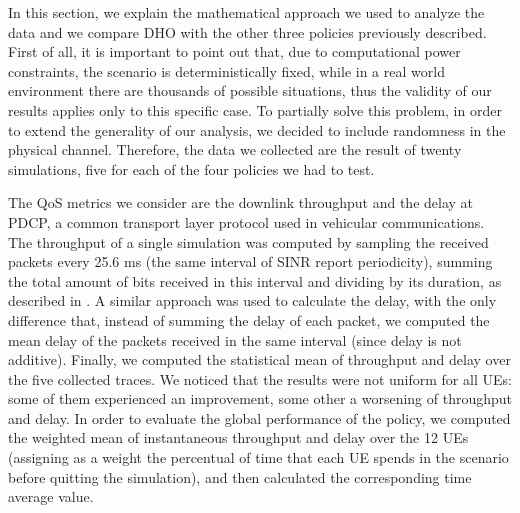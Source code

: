 \documentclass[conference,10pt]{IEEEtran}
\begin{document}
In this section, we explain the mathematical approach we used to analyze the data and we compare DHO with the other three policies previously described.
First of all, it is important to point out that, due to computational power constraints, the scenario is deterministically fixed, while in a real world environment there are thousands of possible situations, thus the validity of our results applies only to this specific case. To partially solve this problem, in order to extend the generality of our analysis, we decided to include randomness in the physical channel. Therefore, the data we collected are the result of twenty simulations, five for each of the four policies we had to test.

The QoS metrics we consider are the downlink throughput and the delay at PDCP, a common transport layer protocol used in vehicular communications. The throughput of a single simulation was computed by sampling the received packets every 25.6 ms (the same interval of SINR report periodicity), summing the total amount of bits received in this interval and dividing by its duration, as described in \cite{imphand}. A similar approach was used to calculate the delay, with the only difference that, instead of summing the delay of each packet, we computed the mean delay of the packets received in the same interval (since delay is not additive). Finally, we computed the statistical mean of throughput and delay over the five collected traces. We noticed that the results were not uniform for all UEs: some of them experienced an improvement, some other a worsening of throughput and delay. In order to evaluate the global performance of the policy, we computed the weighted mean of instantaneous throughput and delay over the 12 UEs (assigning as a weight the percentual of time that each UE spends in the scenario before quitting the simulation), and then calculated the corresponding time average value.
\end{document}

